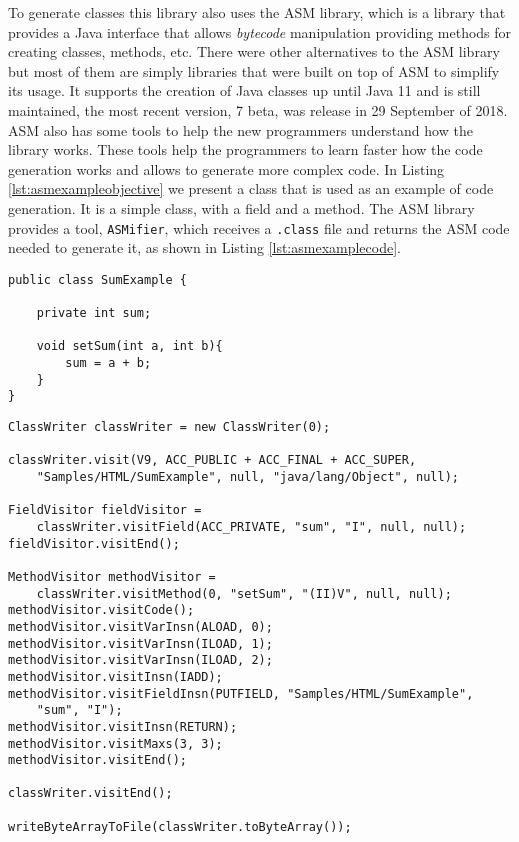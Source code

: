 \noindent
To generate classes this library also uses the ASM\cite{asm} library, which is a library that provides a Java interface that allows \textit{bytecode} manipulation providing methods for creating classes, methods, etc. There were other alternatives to the ASM library but most of them are simply libraries that were built on top of ASM to simplify its usage. It supports the creation of Java classes up until Java 11 and is still maintained, the most recent version, 7 beta, was release in 29 September of 2018. ASM also has some tools to help the new programmers understand how the library works. These tools help the programmers to learn faster how the code generation works and allows to generate more complex code. In Listing \ref{lst:asmexampleobjective} we present a class that is used as an example of code generation. It is a simple class, with a field and a method. The ASM library provides a tool, \texttt{ASMifier}, which receives a \texttt{.class} file and returns the ASM code needed to generate it, as shown in Listing \ref{lst:asmexamplecode}.

\bigskip


\begin{minipage}{\linewidth}
\begin{lstlisting}[caption={ASM Example - Code Generation Objective},captionpos=b,label={lst:asmexampleobjective}]
public class SumExample {

    private int sum;

    void setSum(int a, int b){
        sum = a + b;
    }
}
\end{lstlisting}
\end{minipage}

\bigskip


\begin{minipage}{\linewidth}
\begin{lstlisting}[caption={ASM Example - Required Code},captionpos=b,label={lst:asmexamplecode}]
ClassWriter classWriter = new ClassWriter(0);

classWriter.visit(V9, ACC_PUBLIC + ACC_FINAL + ACC_SUPER, 
	"Samples/HTML/SumExample", null, "java/lang/Object", null);

FieldVisitor fieldVisitor = 
	classWriter.visitField(ACC_PRIVATE, "sum", "I", null, null);
fieldVisitor.visitEnd();

MethodVisitor methodVisitor = 
	classWriter.visitMethod(0, "setSum", "(II)V", null, null);
methodVisitor.visitCode();
methodVisitor.visitVarInsn(ALOAD, 0);
methodVisitor.visitVarInsn(ILOAD, 1);
methodVisitor.visitVarInsn(ILOAD, 2);
methodVisitor.visitInsn(IADD);
methodVisitor.visitFieldInsn(PUTFIELD, "Samples/HTML/SumExample",
	"sum", "I");
methodVisitor.visitInsn(RETURN);
methodVisitor.visitMaxs(3, 3);
methodVisitor.visitEnd();

classWriter.visitEnd();

writeByteArrayToFile(classWriter.toByteArray());
\end{lstlisting}
\end{minipage}

